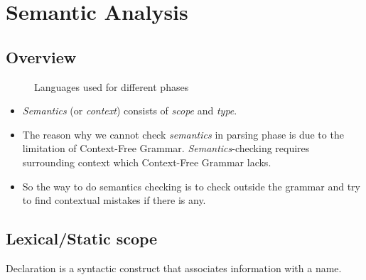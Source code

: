 \section{Semantic Analysis}

\subsection{Overview}

\begin{figure}[H]
    \centering
    \caption{Languages used for different phases}
    \label{fig:language-in-different-phases}
\end{figure}

\begin{itemize}
    \item \textit{Semantics} (or \textit{context}) consists of \textit{scope} and \textit{type}.
    
    \item The reason why we cannot check \textit{semantics} in parsing phase is due to the limitation of Context-Free Grammar. \textit{Semantics}-checking requires surrounding context which Context-Free Grammar lacks.
    
    \item So the way to do semantics checking is to check outside the grammar and try to find contextual mistakes if there is any.
\end{itemize}


\subsection{Lexical/Static scope}
\begin{definition}[Declaration]
    Declaration is a syntactic construct that associates information with a name.
\end{definition}


